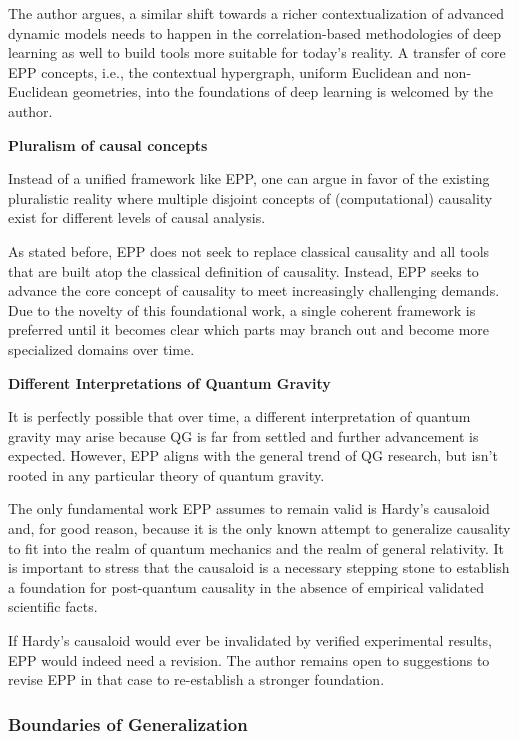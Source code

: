 \documentclass{article}
\begin{document}
The author argues, a similar shift towards a richer contextualization of advanced dynamic models needs to happen in the
correlation-based methodologies of deep learning as well to build tools more suitable for today's reality. A
transfer of core EPP concepts, i.e., the contextual hypergraph, uniform Euclidean and non-Euclidean geometries, into the
foundations of deep learning is welcomed by the author.

\textbf{Pluralism of causal concepts}

Instead of a unified framework like EPP, one can argue in favor of the existing pluralistic reality where multiple disjoint concepts of (computational) causality exist for different levels of causal analysis.

As stated before, EPP does not seek to replace classical causality and all tools that are built atop the classical
definition of causality. Instead, EPP seeks to advance the core concept of causality to meet increasingly challenging
demands. Due to the novelty of this foundational work, a single coherent framework is preferred until it becomes clear
which parts may branch out and become more specialized domains over time.


\textbf{Different Interpretations of Quantum Gravity}

It is perfectly possible that over time, a different interpretation of quantum gravity may arise because QG is far from settled and further advancement is expected. However, EPP aligns with the general trend of QG research, but isn't rooted in any particular theory of quantum gravity.

The only fundamental work EPP assumes to remain valid is Hardy’s causaloid and, for good reason, because it is the only known attempt to generalize causality to fit into the realm of quantum mechanics and the realm of general relativity. It is important to stress that the causaloid is a necessary stepping stone to establish a foundation for post-quantum causality in the absence of empirical validated scientific facts.

If Hardy’s causaloid would ever be invalidated by verified experimental results, EPP would indeed need a revision. The author remains open to suggestions to revise EPP in that case to re-establish a stronger foundation.

\newpage

\subsubsection{Boundaries of Generalization}
\end{document}
